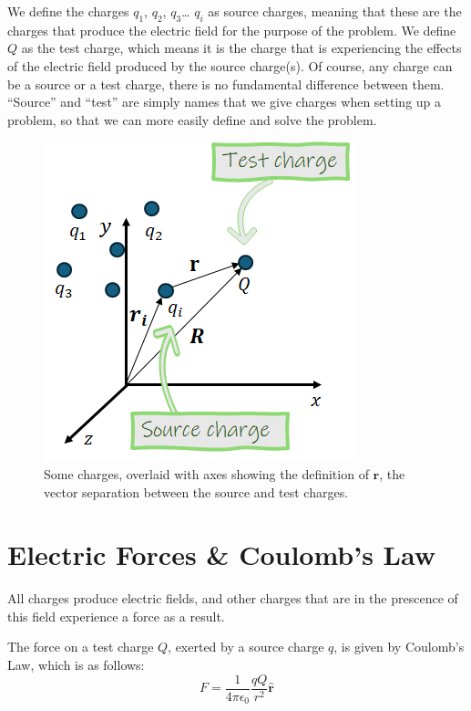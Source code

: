 \documentclass[
  letterpaper,
  DIV=11,
  numbers=noendperiod]{scrreprt}
\begin{document}
We define the charges \(q_1\), \(q_2\), \(q_3\)\ldots{} \(q_i\) as
source charges, meaning that these are the charges that produce the
electric field for the purpose of the problem. We define \(Q\) as the
test charge, which means it is the charge that is experiencing the
effects of the electric field produced by the source charge(s). Of
course, any charge can be a source or a test charge, there is no
fundamental difference between them. ``Source'' and ``test'' are simply
names that we give charges when setting up a problem, so that we can
more easily define and solve the problem.

\begin{figure}[H]

{\centering \includegraphics{Figures/axes_r_definitions.png}

}

\caption{Some charges, overlaid with axes showing the definition of
\(\mathrm{\mathbf{r}}\), the vector separation between the source and
test charges.}

\end{figure}%

\section{Electric Forces \& Coulomb's
Law}\label{electric-forces-coulombs-law}

All charges produce electric fields, and other charges that are in the
prescence of this field experience a force as a result.

The force on a test charge \(Q\), exerted by a source charge \(q\), is
given by Coulomb's Law, which is as follows:
\[ F = \frac{1}{4\pi \epsilon_0} \frac{q Q}{r^2} \hat{\mathrm{\mathbf{r}}} \]
\end{document}

